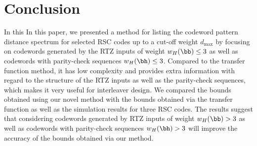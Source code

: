 \section{Conclusion}
\label{sec7}
 



In this In this paper, we presented a method for listing the codeword pattern distance spectrum for selected RSC codes up to a cut-off weight $d_{\text{max}}$ by focusing on codewords generated by the RTZ inputs of weight $w_H(\bb) \leq 3$ as well as codewords with parity-check sequences $w_H(\bh) \leq 3$. Compared to the transfer function method, it has low complexity and provides extra information with regard to the structure of the RTZ inputs as well as the parity-check sequences, which makes it very useful for interleaver design. We compared the bounds obtained using our novel method with the bounds obtained via the transfer function as well as the simulation results for three RSC codes. The results suggest that considering codewords generated by RTZ inputs of weight $w_H(\bb) > 3$ as well as codewords with parity-check sequences $w_H(\bh) > 3$  will improve the accuracy of the bounds obtained via our method.